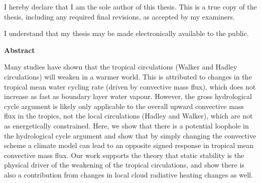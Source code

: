 \cleardoublepage %
 


  \noindent
I hereby declare that I am the sole author of this thesis. This is a true copy of the thesis, including any required final revisions, as accepted by my examiners.

  \bigskip
  
  \noindent
I understand that my thesis may be made electronically available to the public.

\cleardoublepage


\begin{center}\textbf{Abstract}\end{center}

Many studies have shown that the tropical circulations (Walker and Hadley circulations) will weaken in a warmer world. This is attributed to changes in the tropical mean water cycling rate (driven by convective mass flux), which does not increase as fast as boundary layer water vapour. However, the gross hydrological cycle argument is likely only applicable to the overall upward convective mass flux in the tropics, not the local circulations (Hadley and Walker), which are not as energetically constrained. Here, we show that there is a potential loophole in the hydrological cycle argument and show that by simply changing the convective scheme a climate model can lead to an opposite signed response in tropical mean convective mass flux. Our work supports the theory that static stability is the physical driver of the weakening of the tropical circulations, and show there is also a contribution from changes in local cloud radiative heating changes as well.

